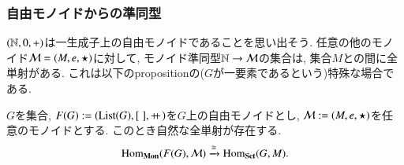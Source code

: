 
\subsubsection{自由モノイドからの準同型}


$({\mathbb N},0,+)$は一生成子上の自由モノイドであることを思い出そう. 任意の他のモノイド$\mathcal{M}=(M,e,\star)$に対して, モノイド準同型${\mathbb N}\rightarrow\mathcal{M}$の集合は, 集合$M$との間に全単射がある. これは以下のpropositionの($G$が一要素であるという)特殊な場合である.

\begin{proposition}\label{prop:free monoid}


$G$を集合, $F(G):=(\List(G),[\;],\plpl)$を$G$上の自由モノイドとし, $\mathcal{M}:=(M,e,\star)$を任意のモノイドとする. このとき自然な全単射が存在する.
$$\Hom_\Mon(F(G),\mcM)\To{\iso}\Hom_\Set(G,M).$$

\end{proposition}

